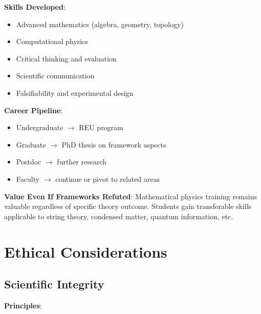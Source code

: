 \textbf{Skills Developed}:
\begin{itemize}
    \item Advanced mathematics (algebra, geometry, topology)
    \item Computational physics
    \item Critical thinking and evaluation
    \item Scientific communication
    \item Falsifiability and experimental design
\end{itemize}

\textbf{Career Pipeline}:
\begin{itemize}
    \item Undergraduate $\to$ REU program
    \item Graduate $\to$ PhD thesis on framework aspects
    \item Postdoc $\to$ further research
    \item Faculty $\to$ continue or pivot to related areas
\end{itemize}

\textbf{Value Even If Frameworks Refuted}:
Mathematical physics training remains valuable regardless of specific theory outcome. Students gain transferable skills applicable to string theory, condensed matter, quantum information, etc.

\section{Ethical Considerations}

\subsection{Scientific Integrity}

\textbf{Principles}:


